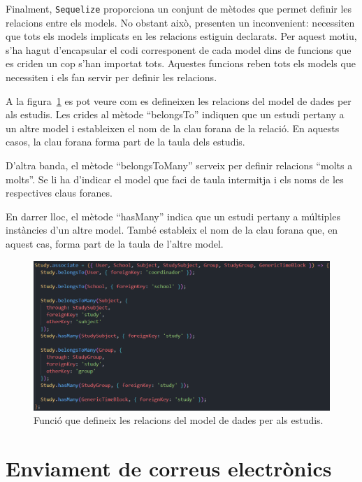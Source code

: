 \documentclass[a4paper,12pt]{ThesisStyle}
\begin{document}
Finalment, \texttt{Sequelize} proporciona un conjunt de mètodes que permet definir les relacions entre els models. No obstant això, presenten un inconvenient: necessiten que tots els models implicats en les relacions estiguin declarats. Per aquest motiu, s'ha hagut d'encapsular el codi corresponent de cada model dins de funcions que es criden un cop s'han importat tots. Aquestes funcions reben tots els models que necessiten i els fan servir per definir les relacions.

A la figura~\ref{img:associate} es pot veure com es defineixen les relacions del model de dades per als estudis. Les crides al mètode ``belongsTo'' indiquen que un estudi pertany a un altre model i estableixen el nom de la clau forana de la relació. En aquests casos, la clau forana forma part de la taula dels estudis.

D'altra banda, el mètode ``belongsToMany'' serveix per definir relacions ``molts a molts''. Se li ha d'indicar el model que faci de taula intermitja i els noms de les respectives claus foranes.

En darrer lloc, el mètode ``hasMany'' indica que un estudi pertany a múltiples instàncies d'un altre model. També estableix el nom de la clau forana que, en aquest cas, forma part de la taula de l'altre model.

\begin{figure}[H]
  \centering
  \includegraphics[width=\textwidth]{assets/code/modelsDades/associate.png}
  \caption{\label{img:associate} Funció que defineix les relacions del model de dades per als estudis.}
\end{figure}

\section{Enviament de correus electrònics}
\label{sec:enviament_correus}
\end{document}
